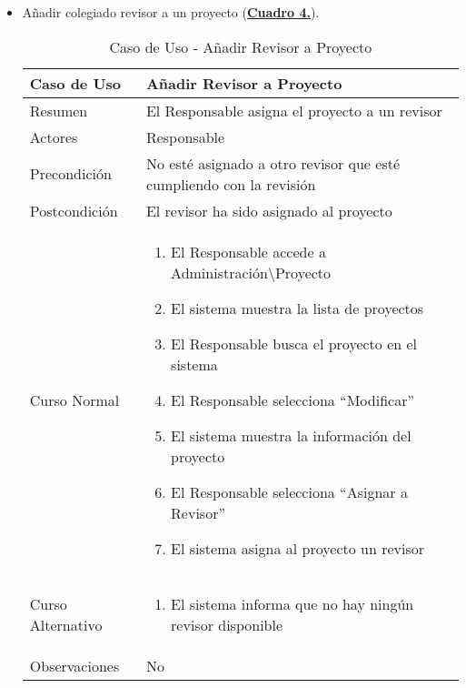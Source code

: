 \begin{itemize}
    \newpage~
		\item \addtocounter{tabla}{1} Añadir colegiado revisor a un proyecto (\textbf{\hyperref[tab:curAsignarRevisorProyecto]{Cuadro 4.}}). 
		\begin{table}[!htbp]
		  \centering  \addtocounter{casouso}{1}
		  \begin{tabular}{|l | p{100mm}|}
		    \textbf{Caso de Uso}  & \textbf{Añadir Revisor a Proyecto} \\ \hline
		    Resumen 		 & El Responsable asigna el proyecto a un revisor \\ \hline
		    Actores  		 & Responsable \\ \hline
		    Precondición  	 & No esté asignado a otro revisor que esté cumpliendo con la revisión  \\ \hline
		    Postcondición  	 & El revisor ha sido asignado al proyecto \\ \hline
		    Curso Normal   	 & \begin{enumerate}
		      \item El Responsable accede a Administración\textbackslash Proyecto
			  \item El sistema muestra la lista de proyectos
			  \item El Responsable busca el proyecto en el sistema
			  \item El Responsable selecciona ``Modificar''
			  \item El sistema muestra la información del proyecto
			  \item El Responsable selecciona ``Asignar a Revisor''
			  \item El sistema asigna al proyecto un revisor
		    \end{enumerate}  \\ \hline
		    Curso Alternativo  & \begin{enumerate}
			  \item El sistema informa que no hay ningún revisor disponible
		    \end{enumerate}  \\ \hline
		    Observaciones 	 & No  \\ \hline
		  \end{tabular}
		  \caption{Caso de Uso  - Añadir Revisor a Proyecto}
		  \label{tab:curAsignarRevisorProyecto}
		\end{table}
		\FloatBarrier


\end{itemize}
